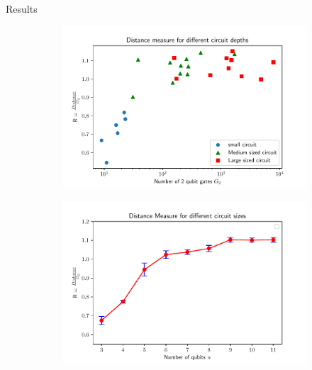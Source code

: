 \documentclass{beamer}
\begin{document}
\begin{frame}{Results}
	\begin{figure}
	\centering
	\begin{subfigure}{0.48\textwidth}
	\centering
		\includegraphics[width=\textwidth]{figures/R_vs_d}
	\end{subfigure}
	\begin{subfigure}{0.48\textwidth}
	\centering
		\includegraphics[width=\textwidth]{figures/R_vs_n}
	\end{subfigure}
	\end{figure}
\end{frame}
\end{document}
